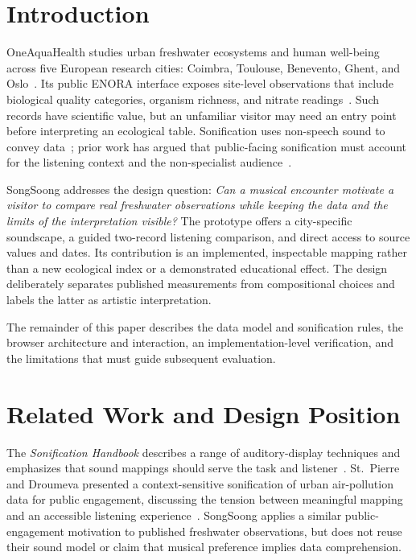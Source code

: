 \documentclass[conference]{IEEEtran}
\begin{document}
\section{Introduction}
OneAquaHealth studies urban freshwater ecosystems and human well-being across five European research cities: Coimbra, Toulouse, Benevento, Ghent, and Oslo~\cite{oah-cities}. Its public ENORA interface exposes site-level observations that include biological quality categories, organism richness, and nitrate readings~\cite{enora-api}. Such records have scientific value, but an unfamiliar visitor may need an entry point before interpreting an ecological table. Sonification uses non-speech sound to convey data~\cite{handbook}; prior work has argued that public-facing sonification must account for the listening context and the non-specialist audience~\cite{stpierre2016}.

SongSoong addresses the design question: \emph{Can a musical encounter motivate a visitor to compare real freshwater observations while keeping the data and the limits of the interpretation visible?} The prototype offers a city-specific soundscape, a guided two-record listening comparison, and direct access to source values and dates. Its contribution is an implemented, inspectable mapping rather than a new ecological index or a demonstrated educational effect. The design deliberately separates published measurements from compositional choices and labels the latter as artistic interpretation.

The remainder of this paper describes the data model and sonification rules, the browser architecture and interaction, an implementation-level verification, and the limitations that must guide subsequent evaluation.

\section{Related Work and Design Position}
The \emph{Sonification Handbook} describes a range of auditory-display techniques and emphasizes that sound mappings should serve the task and listener~\cite{handbook}. St.~Pierre and Droumeva presented a context-sensitive sonification of urban air-pollution data for public engagement, discussing the tension between meaningful mapping and an accessible listening experience~\cite{stpierre2016}. SongSoong applies a similar public-engagement motivation to published freshwater observations, but does not reuse their sound model or claim that musical preference implies data comprehension.
\end{document}
